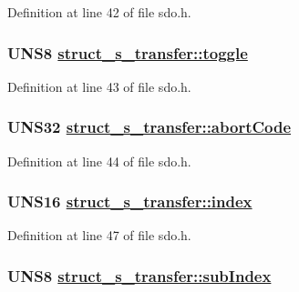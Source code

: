 Definition at line 42 of file sdo.h.\hypertarget{structstruct__s__transfer_8b43e3d56cae7eb574d239f85b6aebb2}{
\subsubsection[toggle]{\setlength{\rightskip}{0pt plus 5cm}UNS8 \hyperlink{structstruct__s__transfer_8b43e3d56cae7eb574d239f85b6aebb2}{struct\_\-s\_\-transfer::toggle}}}
\label{structstruct__s__transfer_8b43e3d56cae7eb574d239f85b6aebb2}




Definition at line 43 of file sdo.h.\hypertarget{structstruct__s__transfer_214694408d5f6e87695807efd2cfbc47}{
\subsubsection[abortCode]{\setlength{\rightskip}{0pt plus 5cm}UNS32 \hyperlink{structstruct__s__transfer_214694408d5f6e87695807efd2cfbc47}{struct\_\-s\_\-transfer::abort\-Code}}}
\label{structstruct__s__transfer_214694408d5f6e87695807efd2cfbc47}




Definition at line 44 of file sdo.h.\hypertarget{structstruct__s__transfer_36eca18553634876a27fc4b89578e3bc}{
\subsubsection[index]{\setlength{\rightskip}{0pt plus 5cm}UNS16 \hyperlink{structstruct__s__transfer_36eca18553634876a27fc4b89578e3bc}{struct\_\-s\_\-transfer::index}}}
\label{structstruct__s__transfer_36eca18553634876a27fc4b89578e3bc}




Definition at line 47 of file sdo.h.\hypertarget{structstruct__s__transfer_fca5916593f97eb6d006fe11c7b28983}{
\subsubsection[subIndex]{\setlength{\rightskip}{0pt plus 5cm}UNS8 \hyperlink{structstruct__s__transfer_fca5916593f97eb6d006fe11c7b28983}{struct\_\-s\_\-transfer::sub\-Index}}}
\label{structstruct__s__transfer_fca5916593f97eb6d006fe11c7b28983}




